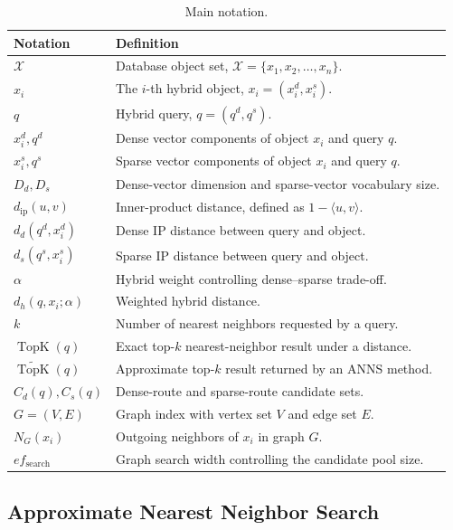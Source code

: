 \begin{table}[t]
\centering
\caption{Main notation.}
\label{tab:notation}
\begin{tabular}{p{}p{}}
\hline
Notation & Definition \\
\hline
$\mathcal{X}$ & Database object set, $\mathcal{X}=\{x_1,x_2,\ldots,x_n\}$. \\
$x_i$ & The $i$-th hybrid object, $x_i=(x_i^d,x_i^s)$. \\
$q$ & Hybrid query, $q=(q^d,q^s)$. \\
$x_i^d, q^d$ & Dense vector components of object $x_i$ and query $q$. \\
$x_i^s, q^s$ & Sparse vector components of object $x_i$ and query $q$. \\
$D_d, D_s$ & Dense-vector dimension and sparse-vector vocabulary size. \\
$d_{\mathrm{ip}}(u,v)$ & Inner-product distance, defined as $1-\langle u,v\rangle$. \\
$d_d(q^d,x_i^d)$ & Dense IP distance between query and object. \\
$d_s(q^s,x_i^s)$ & Sparse IP distance between query and object. \\
$\alpha$ & Hybrid weight controlling dense--sparse trade-off. \\
$d_h(q,x_i;\alpha)$ & Weighted hybrid distance. \\
$k$ & Number of nearest neighbors requested by a query. \\
$\operatorname{TopK}(q)$ & Exact top-$k$ nearest-neighbor result under a distance. \\
$\widetilde{\operatorname{TopK}}(q)$ & Approximate top-$k$ result returned by an ANNS method. \\
$C_d(q), C_s(q)$ & Dense-route and sparse-route candidate sets. \\
$G=(V,E)$ & Graph index with vertex set $V$ and edge set $E$. \\
$N_G(x_i)$ & Outgoing neighbors of $x_i$ in graph $G$. \\
$ef_{\mathrm{search}}$ & Graph search width controlling the candidate pool size. \\
\hline
\end{tabular}
\end{table}

\subsection{Approximate Nearest Neighbor Search}

